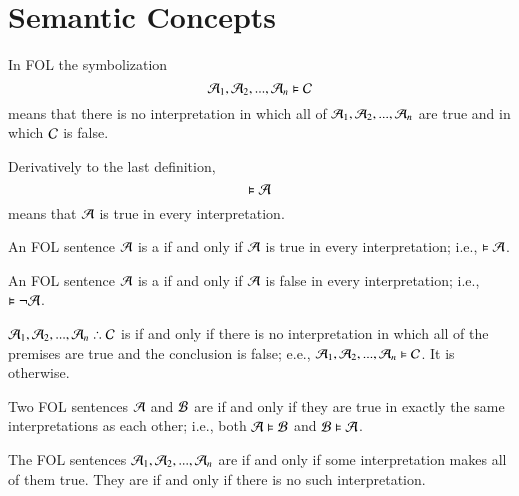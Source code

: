 \documentclass[12pt, a4paper, twoside, openright, titlepage]{book}
\begin{document}
\section{\textsection Semantic Concepts}

\begin{defn}{}{}
    In FOL the symbolization \begin{equation*}
        \mathcal{A}_1,\mathcal{A}_2,...,\mathcal{A}_n\vDash \mathcal{C}
    \end{equation*}
    means that there is no interpretation in which all of $\mathcal{A}_1,\mathcal{A}_2,...,\mathcal{A}_n$ are true and in which $\mathcal{C}$ is false.
\end{defn}


\begin{defn}{}{}
    Derivatively to the last definition, \begin{equation*}
        \vDash \mathcal{A}
    \end{equation*}
    means that $\mathcal{A}$ is true in every interpretation. 
\end{defn}

\begin{defn}{}{}
    An FOL sentence $\mathcal{A}$ is a  if and only if $\mathcal{A}$ is true in every interpretation; i.e., $\vDash \mathcal{A}$.
\end{defn}

\begin{defn}{}{}
    An FOL sentence $\mathcal{A}$ is a  if and only if $\mathcal{A}$ is false in every interpretation; i.e., $\vDash \neg\mathcal{A}$.
\end{defn}

\begin{defn}{}{}
    $\metav{A}_1,\metav{A}_2,...,\metav{A}_n\therefore \metav{C}$ is  if and only if there is no interpretation in which all of the premises are true and the conclusion is false; e.e., $\mathcal{A}_1,\mathcal{A}_2,...,\mathcal{A}_n\vDash\mathcal{C}$. It is  otherwise.
\end{defn}


\begin{defn}{}{}
    Two FOL sentences $\mathcal{A}$ and $\mathcal{B}$ are  if and only if they are true in exactly the same interpretations as each other; i.e., both $\mathcal{A}\vDash \mathcal{B}$ and $\mathcal{B}\vDash \mathcal{A}$.
\end{defn}

\begin{defn}{}{}
    The FOL sentences $\mathcal{A}_1,\mathcal{A}_2,...,\mathcal{A}_n$ are  if and only if some interpretation makes all of them true. They are  if and only if there is no such interpretation.
\end{defn}
\end{document}
